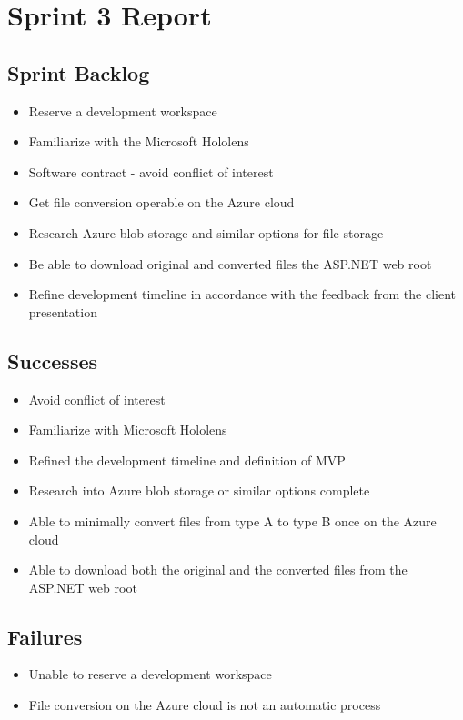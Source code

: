 
\section{Sprint 3 Report}
\label{sec:Sprint3_report}
    \subsection{Sprint Backlog}
    \label{sec:Sprint3_backlog}
        \begin{itemize}
            \item Reserve a development workspace
            \item Familiarize with the Microsoft Hololens
            \item Software contract - avoid conflict of interest
            \item Get file conversion operable on the Azure cloud
            \item Research Azure blob storage and similar options for file storage
            \item Be able to download original and converted files the ASP.NET web root
            \item Refine development timeline in accordance with the feedback from the client presentation            
        \end{itemize}

    \subsection{Successes}
    \label{sec:Sprint3_successes}
        \begin{itemize}
            \item Avoid conflict of interest
            \item Familiarize with Microsoft Hololens
            \item Refined the development timeline and definition of MVP
            \item Research into Azure blob storage or similar options complete
            \item Able to minimally convert files from type A to type B once on the Azure cloud
            \item Able to download both the original and the converted files from the ASP.NET web root
        \end{itemize}

    \subsection{Failures}
    \label{sec:Sprint3_failures}
        \begin{itemize}
            \item Unable to reserve a development workspace
            \item File conversion on the Azure cloud is not an automatic process
        \end{itemize}

